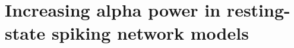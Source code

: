 \documentclass[../main.tex]{subfiles}
\begin{document}
\chapter{Increasing alpha power in resting-state spiking network models}




% 

\printbibliography
\end{document}
